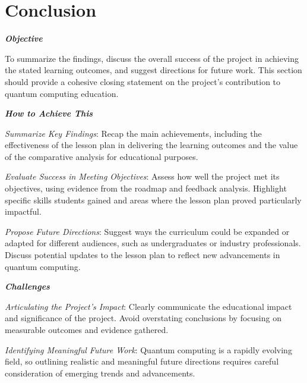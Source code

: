 \section{Conclusion}


\textbf{\emph{Objective}}

To summarize the findings, discuss the overall success of the project in achieving the stated learning outcomes, and suggest directions for future work. This section should provide a cohesive closing statement on the project’s contribution to quantum computing education.

\textbf{\emph{How to Achieve This}}

\emph{Summarize Key Findings}: Recap the main achievements, including the effectiveness of the lesson plan in delivering the learning outcomes and the value of the comparative analysis for educational purposes.

\emph{Evaluate Success in Meeting Objectives}: Assess how well the project met its objectives, using evidence from the roadmap and feedback analysis. Highlight specific skills students gained and areas where the lesson plan proved particularly impactful.

\emph{Propose Future Directions}: Suggest ways the curriculum could be expanded or adapted for different audiences, such as undergraduates or industry professionals. Discuss potential updates to the lesson plan to reflect new advancements in quantum computing.

\textbf{\emph{Challenges}}

\emph{Articulating the Project’s Impact}: Clearly communicate the educational impact and significance of the project. Avoid overstating conclusions by focusing on measurable outcomes and evidence gathered.

\emph{Identifying Meaningful Future Work}: Quantum computing is a rapidly evolving field, so outlining realistic and meaningful future directions requires careful consideration of emerging trends and advancements.
    

